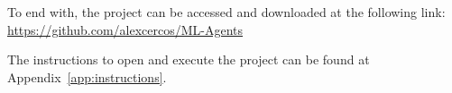 To end with, the project can be accessed and downloaded at the following link: \url{https://github.com/alexcercos/ML-Agents}

The instructions to open and execute the project can be found at Appendix~\ref{app:instructions}.

